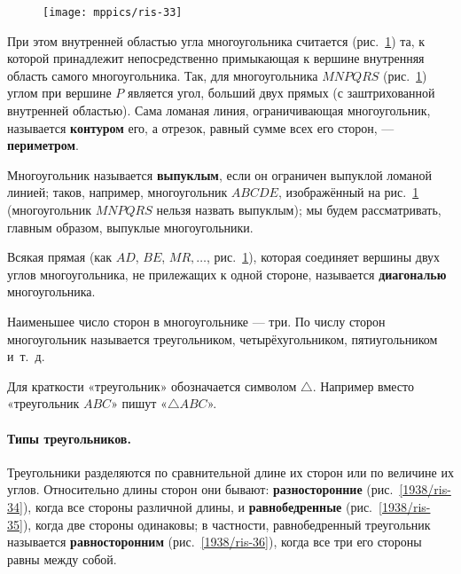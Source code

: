 \documentclass[oneside]{book}
\begin{document}
\begin{figure}[h!]
\centering
\texttt{[image: mppics/ris-33]}
\caption{}\label{1938/ris-33}
\end{figure}

При этом внутренней областью угла многоугольника считается (рис.~\ref{1938/ris-33}) та, к которой принадлежит непосредственно примыкающая к вершине внутренняя область самого многоугольника.
Так, для многоугольника $MNPQRS$ (рис.~\ref{1938/ris-33}) углом при вершине $P$ является угол, больший двух прямых (с заштрихованной внутренней областью).
Сама ломаная линия, ограничивающая многоугольник, называется \textbf{контуром} его, а отрезок, равный сумме всех его сторон, — \textbf{периметром}.

Многоугольник называется \textbf{выпуклым}, если он ограничен выпуклой ломаной линией;
таков, например, многоугольник $ABCDE$, изображённый на рис.~\ref{1938/ris-33} (многоугольник $MNPQRS$ нельзя назвать выпуклым);
мы будем рассматривать, главным образом, выпуклые многоугольники.

Всякая прямая (как $AD$, $BE$, $MR,\dots$, рис.~\ref{1938/ris-33}), которая соединяет вершины двух углов многоугольника, не прилежащих к одной стороне, называется \textbf{диагональю} многоугольника.

Наименьшее число сторон в многоугольнике — три.
По числу сторон многоугольник называется треугольником, четырёхугольником, пятиугольником и~т.~д.

Для краткости «треугольник» обозначается символом $\triangle$.
Например вместо «треугольник $ABC$» пишут «$\triangle ABC$».

\paragraph{Типы треугольников.}\label{1938/35}
Треугольники разделяются по сравнительной длине их сторон или по величине их углов.
Относительно длины сторон они бывают:
\textbf{разносторонние} (рис.~\ref{1938/ris-34}), когда все стороны различной длины, и \textbf{равнобедренные} (рис.~\ref{1938/ris-35}), когда две стороны одинаковы;
в частности, равнобедренный треугольник называется \textbf{равносторонним} (рис.~\ref{1938/ris-36}), когда все три его стороны равны между собой.
\end{document}
